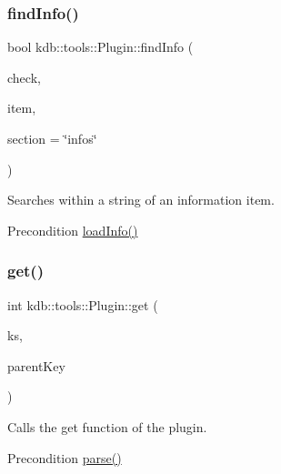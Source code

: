 \subsubsection{\texorpdfstring{findInfo()}{findInfo()}}
{\footnotesize\ttfamily bool kdb\+::tools\+::\+Plugin\+::find\+Info (\begin{DoxyParamCaption}\item[{std\+::string}]{check,  }\item[{std\+::string}]{item,  }\item[{std\+::string}]{section = {\ttfamily \char`\"{}infos\char`\"{}} }\end{DoxyParamCaption})}



Searches within a string of an information item. 

\begin{DoxyPrecond}{Precondition}
\mbox{\hyperlink{classkdb_1_1tools_1_1Plugin_a3a0c6a956d1714002ef9baf8c9d99167}{load\+Info()}} 
\end{DoxyPrecond}
\mbox{\label{classkdb_1_1tools_1_1Plugin_a2aa6ff55f9cf81a59d2a8d271fe68e0f}} 
\subsubsection{\texorpdfstring{get()}{get()}}
{\footnotesize\ttfamily int kdb\+::tools\+::\+Plugin\+::get (\begin{DoxyParamCaption}\item[{\mbox{\hyperlink{classkdb_1_1KeySet}{kdb\+::\+Key\+Set}} \&}]{ks,  }\item[{\mbox{\hyperlink{classkdb_1_1Key}{kdb\+::\+Key}} \&}]{parent\+Key }\end{DoxyParamCaption})}



Calls the get function of the plugin. 

\begin{DoxyPrecond}{Precondition}
\mbox{\hyperlink{classkdb_1_1tools_1_1Plugin_adfcba2fbdeb436a1083410df804d5fb0}{parse()}} 
\end{DoxyPrecond}
\mbox{\label{classkdb_1_1tools_1_1Plugin_af3004444f5ef05dc8106646ff2b95694}} 
